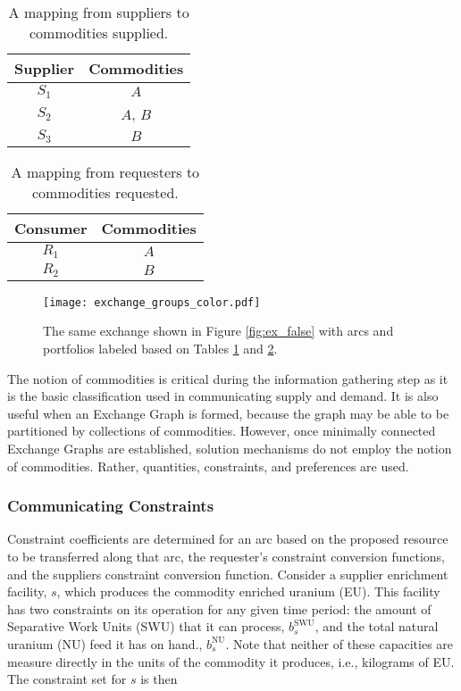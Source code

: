 \begin{table}[h]
\centering
\begin{tabular}{c|c}
Supplier & Commodities \\ \hline
$S_1$             & $A$         \\
$S_2$             & $A$, $B$    \\
$S_3$             & $B$         \\
\end{tabular}
\caption{A mapping from suppliers to commodities supplied.}
\label{tbl:ex_sup}
\end{table}

\begin{table}[h]
\centering
\begin{tabular}{c|c}
Consumer & Commodities \\ \hline
$R_1$             & $A$         \\
$R_2$             & $B$        
\end{tabular}
\caption{A mapping from requesters to commodities requested.}
\label{tbl:ex_req}
\end{table}

\begin{figure}
  \begin{center}
    \texttt{[image: exchange\_groups\_color.pdf]}
    \caption{The same exchange shown in Figure \ref{fig:ex_false} with arcs and
      portfolios labeled based on Tables \ref{tbl:ex_sup} and
      \ref{tbl:ex_req}. }
    \label{fig:ex_groups_color}
  \end{center}
\end{figure}

The notion of commodities is critical during the information gathering step as
it is the basic classification used in communicating supply and demand. It is
also useful when an Exchange Graph is formed, because the graph may be able to
be partitioned by collections of commodities. However, once minimally connected
Exchange Graphs are established, solution mechanisms do not employ the notion of
commodities. Rather, quantities, constraints, and preferences are used.

\subsubsection{Communicating Constraints}

Constraint coefficients are determined for an arc based on the proposed resource
to be transferred along that arc, the requester's constraint conversion
functions, and the suppliers constraint conversion function. Consider a supplier
enrichment facility, $s$, which produces the commodity enriched uranium
(EU). This facility has two constraints on its operation for any given time
period: the amount of Separative Work Units (SWU) that it can process,
$b_{s}^{\text{SWU}}$, and the total natural uranium (NU) feed it has on hand.,
$b_{s}^{\text{NU}}$.  Note that neither of these capacities are measure directly in the
units of the commodity it produces, i.e., kilograms of EU. The constraint set
for $s$ is then
 
